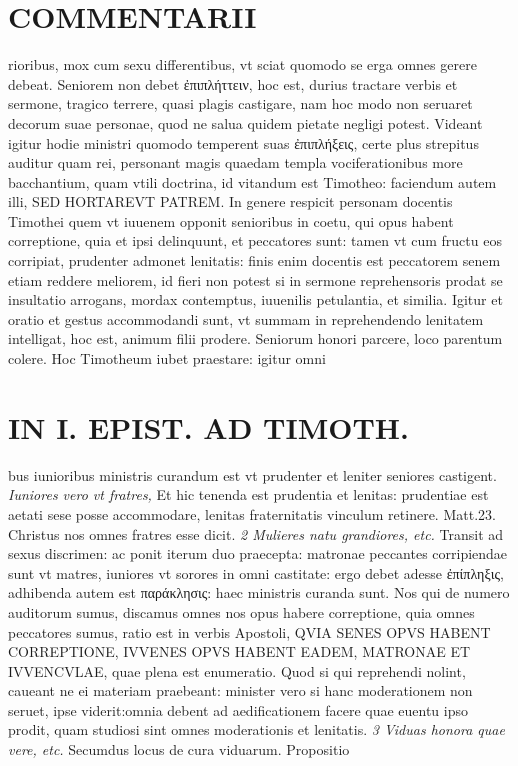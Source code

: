 \documentclass{article}
\begin{document}
\begin{pages}
\section*{COMMENTARII }
\marginpar{[ p.118 ]}\pstart rioribus, mox cum sexu differentibus, vt sciat quomodo se erga omnes gerere debeat. Seniorem non debet ἐπιπλήττειν, hoc est, durius tractare verbis et sermone, tragico terrere, quasi plagis castigare, nam hoc modo non seruaret decorum suae personae, quod ne salua quidem pietate negligi potest. Videant igitur hodie ministri quomodo temperent suas ἐπιπλήξεις, certe plus strepitus auditur quam rei, personant magis quaedam templa vociferationibus more bacchantium, quam vtili doctrina, id vitandum est Timotheo: faciendum autem illi, SED HORTAREVT PATREM. In genere respicit personam docentis Timothei quem vt iuuenem opponit senioribus in coetu, qui opus habent correptione, quia et ipsi delinquunt, et peccatores sunt: tamen vt cum fructu eos corripiat, prudenter admonet lenitatis: finis enim docentis est peccatorem senem etiam reddere meliorem, id fieri non potest si in sermone reprehensoris prodat se insultatio arrogans, mordax contemptus, iuuenilis petulantia, et similia. Igitur et oratio et gestus accommodandi sunt, vt summam in reprehendendo lenitatem intelligat, hoc est, animum filii prodere. Seniorum honori parcere, loco parentum colere. Hoc Timotheum iubet praestare: igitur omni\pend
\section*{IN I. EPIST. AD TIMOTH. }
\marginpar{[ p.119 ]}\pstart bus iunioribus ministris curandum est vt prudenter et leniter seniores castigent.  \pend
\textit{Iuniores vero vt fratres, }\pstart Et hic tenenda est prudentia et lenitas: prudentiae est aetati sese posse accommodare, lenitas fraternitatis vinculum retinere. Matt.23. Christus nos omnes fratres esse dicit.  \pend
\textit{2 Mulieres natu grandiores, etc. }\pstart Transit ad sexus discrimen: ac ponit iterum duo praecepta: matronae peccantes corripiendae sunt vt matres, iuniores vt sorores in omni castitate: ergo debet adesse ἐπίπληξις, adhibenda autem est παράκλησις: haec ministris curanda sunt. Nos qui de numero auditorum sumus, discamus omnes nos opus habere correptione, quia omnes peccatores sumus, ratio est in verbis Apostoli, QVIA SENES OPVS HABENT CORREPTIONE, IVVENES OPVS HABENT EADEM, MATRONAE ET IVVENCVLAE, quae plena est enumeratio. Quod si qui reprehendi nolint, caueant ne ei materiam praebeant: minister vero si hanc moderationem non seruet, ipse viderit:omnia debent ad aedificationem facere quae euentu ipso prodit, quam studiosi sint omnes moderationis et lenitatis.  \pend
\textit{3 Viduas honora quae vere, etc. }\pstart Secumdus locus de cura viduarum. Propositio  \pend

\end{pages}
\end{document}
